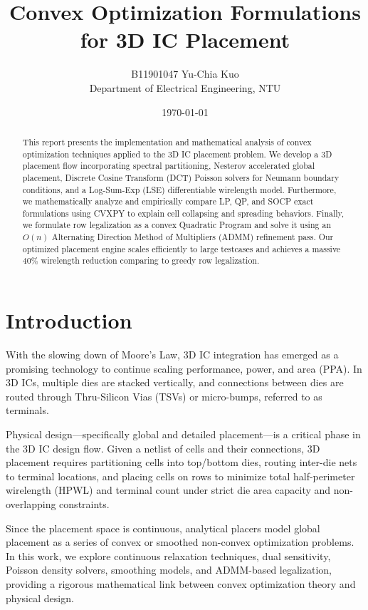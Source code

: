 \documentclass[10pt, twocolumn]{article}
\title{\textbf{Convex Optimization Formulations for 3D IC Placement}}
\author{B11901047 Yu-Chia Kuo \\ Department of Electrical Engineering, NTU}
\date{\today}
\begin{document}
\maketitle

\begin{abstract}
This report presents the implementation and mathematical analysis of convex optimization techniques applied to the 3D IC placement problem. We develop a 3D placement flow incorporating spectral partitioning, Nesterov accelerated global placement, Discrete Cosine Transform (DCT) Poisson solvers for Neumann boundary conditions, and a Log-Sum-Exp (LSE) differentiable wirelength model. Furthermore, we mathematically analyze and empirically compare LP, QP, and SOCP exact formulations using CVXPY to explain cell collapsing and spreading behaviors. Finally, we formulate row legalization as a convex Quadratic Program and solve it using an $O(n)$ Alternating Direction Method of Multipliers (ADMM) refinement pass. Our optimized placement engine scales efficiently to large testcases and achieves a massive 40\% wirelength reduction comparing to greedy row legalization.
\end{abstract}

\section{Introduction}
With the slowing down of Moore's Law, 3D IC integration has emerged as a promising technology to continue scaling performance, power, and area (PPA). In 3D ICs, multiple dies are stacked vertically, and connections between dies are routed through Thru-Silicon Vias (TSVs) or micro-bumps, referred to as terminals. 

Physical design—specifically global and detailed placement—is a critical phase in the 3D IC design flow. Given a netlist of cells and their connections, 3D placement requires partitioning cells into top/bottom dies, routing inter-die nets to terminal locations, and placing cells on rows to minimize total half-perimeter wirelength (HPWL) and terminal count under strict die area capacity and non-overlapping constraints. 

Since the placement space is continuous, analytical placers model global placement as a series of convex or smoothed non-convex optimization problems. In this work, we explore continuous relaxation techniques, dual sensitivity, Poisson density solvers, smoothing models, and ADMM-based legalization, providing a rigorous mathematical link between convex optimization theory and physical design.
\end{document}
